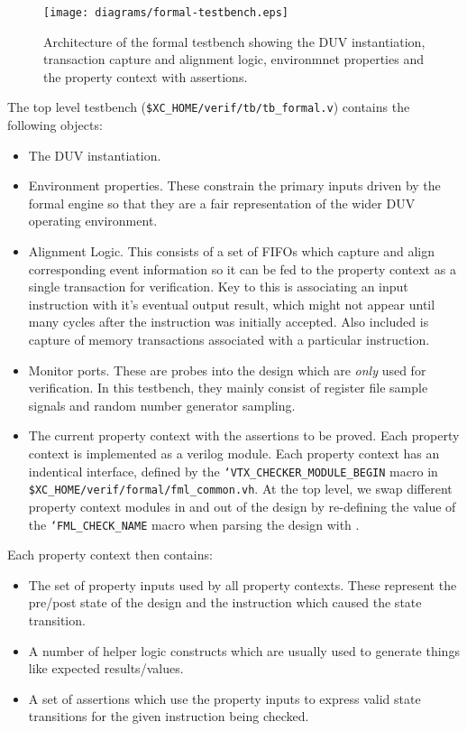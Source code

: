 \begin{figure}[h]
\centering
\texttt{[image: diagrams/formal-testbench.eps]}
\caption{Architecture of the formal testbench showing the DUV instantiation,
transaction capture and alignment logic, environmnet properties and
the property context with assertions.}
\label{fig:formal-tb-arch}
\end{figure}

The top level testbench ({\tt \$XC\_HOME/verif/tb/tb\_formal.v}) contains
the following objects:

\begin{itemize}
\item The DUV instantiation.
\item Environment properties.
    These constrain the primary inputs driven by the formal engine so that
    they are a fair representation of the wider DUV operating environment.
\item Alignment Logic.
    This consists of a set of FIFOs which capture and align corresponding
    event information so it can be fed to the property context as a single
    transaction for verification.
    Key to this is associating an input instruction with it's eventual
    output result, which might not appear until many cycles after the
    instruction was initially accepted.
    Also included is capture of memory transactions associated with a
    particular instruction.
\item Monitor ports.
    These are probes into the design which are {\em only} used for
    verification. In this testbench, they mainly consist of register file
    sample signals and random number generator sampling.
\item The current property context with the assertions to be proved.
    Each property context is implemented as a verilog module.
    Each property context has an indentical interface, defined by the
    {\tt `VTX\_CHECKER\_MODULE\_BEGIN}
    macro in
    {\tt \$XC\_HOME/verif/formal/fml\_common.vh}.
    At the top level, we swap different property context modules in and
    out of the design by re-defining the value of the
    {\tt `FML\_CHECK\_NAME}
    macro when parsing the design with \yosys.
\end{itemize}

\noindent
Each property context then contains:

\begin{itemize}
\item The set of property inputs used by all property contexts.
    These represent the pre/post state of the design and the instruction
    which caused the state transition.
\item A number of helper logic constructs which are usually used to generate
    things like expected results/values.
\item A set of assertions which use the property inputs to express valid
    state transitions for the given instruction being checked.
\end{itemize}

